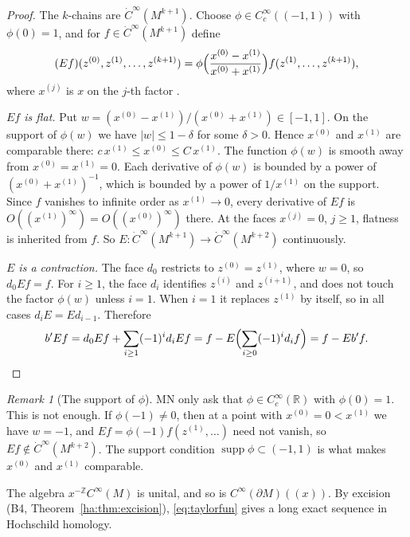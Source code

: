\documentclass[11pt,oneside,reqno]{article}
\DeclareMathOperator{\supp}{supp}
\newcommand{\R}{\mathbb R}
\newcommand{\Z}{\mathbb Z}
\newcommand{\CI}{C^\infty}
\newcommand{\dCI}{\dot C^\infty}
\theoremstyle{plain}
\theoremstyle{definition}
\theoremstyle{remark}
\newtheorem{remark}[theorem]{Remark}
\newcommand{\Lser}[1]{(\!(#1)\!)}
\begin{document}
\begin{proof}
The \(k\)-chains are \(\dCI(M^{k+1})\). Choose
\(\phi\in\CI_c((-1,1))\) with \(\phi(0)=1\), and for
\(f\in\dCI(M^{k+1})\) define
\begin{equation}\label{eq:E}
 (Ef)(z^{(0)},z^{(1)},\dots,z^{(k+1)})=
 \phi\Bigl(\frac{x^{(0)}-x^{(1)}}{x^{(0)}+x^{(1)}}\Bigr)
 f(z^{(1)},\dots,z^{(k+1)}) ,
\end{equation}
where \(x^{(j)}\) is \(x\) on the \(j\)-th factor \cite[(26)]{MN}.

\emph{\(Ef\) is flat.} Put \(w=(x^{(0)}-x^{(1)})/(x^{(0)}+x^{(1)})\in[-1,1]\).
On the support of \(\phi(w)\) we have \(|w|\le1-\delta\) for some
\(\delta>0\). Hence \(x^{(0)}\) and \(x^{(1)}\) are comparable there:
\(c\,x^{(1)}\le x^{(0)}\le C\,x^{(1)}\). The function \(\phi(w)\) is smooth
away from \(x^{(0)}=x^{(1)}=0\). Each derivative of \(\phi(w)\) is
bounded by a power of \((x^{(0)}+x^{(1)})^{-1}\), which is bounded by a
power of \(1/x^{(1)}\) on the support. Since \(f\) vanishes to infinite
order as \(x^{(1)}\to0\), every derivative of \(Ef\) is
\(O((x^{(1)})^\infty)=O((x^{(0)})^\infty)\) there. At the faces
\(x^{(j)}=0\), \(j\ge1\), flatness is inherited from \(f\). So
\(E:\dCI(M^{k+1})\to\dCI(M^{k+2})\) continuously.

\emph{\(E\) is a contraction.} The face \(d_0\) restricts to
\(z^{(0)}=z^{(1)}\), where \(w=0\), so \(d_0Ef=f\). For \(i\ge1\), the
face \(d_i\) identifies \(z^{(i)}\) and \(z^{(i+1)}\), and does not touch
the factor \(\phi(w)\) unless \(i=1\). When \(i=1\) it replaces \(z^{(1)}\)
by itself, so in all cases \(d_iE=Ed_{i-1}\). Therefore
\[
 b'Ef=d_0Ef+\sum_{i\ge1}(-1)^id_iEf=f-E\Bigl(\sum_{i\ge0}(-1)^id_if\Bigr)
 =f-Eb'f. \qedhere
\]
\end{proof}

\begin{remark}[The support of \(\phi\)]\label{rem:phi}
MN only ask that \(\phi\in\CI_c(\R)\) with \(\phi(0)=1\). This is not
enough. If \(\phi(-1)\ne0\), then at a point with \(x^{(0)}=0<x^{(1)}\)
we have \(w=-1\), and \(Ef=\phi(-1)f(z^{(1)},\dots)\) need not vanish, so
\(Ef\notin\dCI(M^{k+2})\). The support condition \(\supp\phi\subset(-1,1)\)
is what makes \(x^{(0)}\) and \(x^{(1)}\) comparable.
\end{remark}

The algebra \(x^{-\Z}\CI(M)\) is unital, and so is
\(\CI(\partial M)\Lser{x}\). By excision (B4, Theorem~\ref{ha:thm:excision}),
\eqref{eq:taylorfun} gives a long exact sequence in Hochschild homology.
\end{document}

